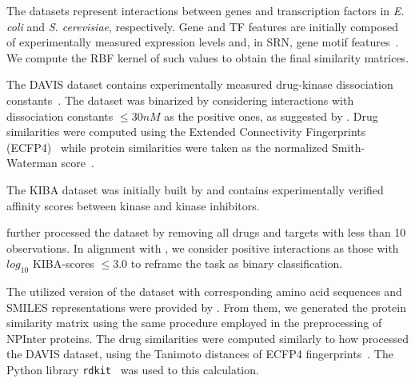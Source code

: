The datasets represent interactions between genes and transcription factors in \textit{E. coli} and \textit{S. cerevisiae}, respectively. Gene and TF features are initially composed of experimentally measured expression levels and, in SRN, gene motif features~\cite{brohee2011,schrynemackers2015}. We compute the RBF kernel of such values to obtain the final similarity matrices. %

The DAVIS dataset contains experimentally measured drug-kinase dissociation constants~\cite{davis2011}. The dataset was binarized by considering interactions with dissociation constants $\le 30 nM$ as the positive ones, as suggested by \cite{pahikkala2015}. Drug similarities were computed using the Extended Connectivity Fingerprints (ECFP4)~\cite{rogers2005, pahikkala2015} while protein similarities were taken as the normalized Smith-Waterman score~\cite{yamanishi2008,pahikkala2015}.

The KIBA dataset was initially built by \citeauthor{tang2014} and contains experimentally verified affinity scores between kinase and kinase inhibitors.

\cite{he2017simboost} further processed the dataset by removing all drugs and targets with less than 10 observations. In alignment with \cite{tang2014,he2017simboost}, we consider positive interactions as those with $log_10$ KIBA-scores $\leq 3.0$ to reframe the task as binary classification.

The utilized version of the dataset with corresponding amino acid sequences and SMILES representations were provided by \cite{huang2020deeppurpose}. From them, we generated the protein similarity matrix using the same procedure employed in the preprocessing of NPInter proteins. The drug similarities were computed similarly to how \cite{pahikkala2015} processed the DAVIS dataset, using the Tanimoto distances of ECFP4 fingerprints~\cite{rogers2005, pahikkala2015}. The Python library \texttt{rdkit}~\cite{rdkit} was used to this calculation.


